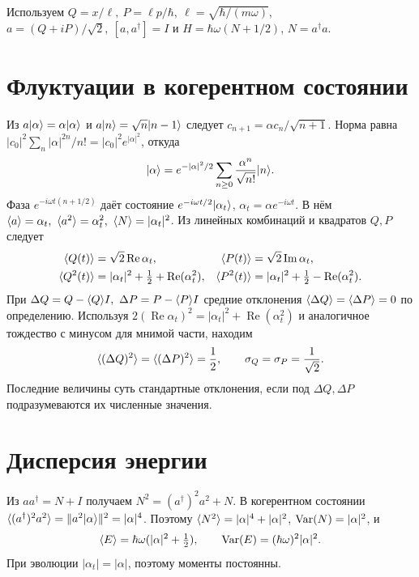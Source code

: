 \documentclass[11pt,a4paper]{article}
\begin{document}

Используем \(Q=x/\ell,\ P=\ell p/\hbar,\ \ell=\sqrt{\hbar/(m\omega)}\),
\(a=(Q+iP)/\sqrt2,\ [a,a^\dagger]=I\) и
\(H=\hbar\omega(N+1/2)\), \(N=a^\dagger a\).

\section{Флуктуации в когерентном состоянии}

Из \(a\lvert \alpha\rangle=\alpha\lvert \alpha\rangle\) и
\(a\lvert n\rangle=\sqrt n\lvert n-1\rangle\) следует
\(c_{n+1}=\alpha c_n/\sqrt{n+1}\). Норма равна
\(|c_0|^2\sum_n|\alpha|^{2n}/n!=|c_0|^2e^{|\alpha|^2}\),
откуда
\[
 \lvert \alpha\rangle=e^{-|\alpha|^2/2}\sum_{n\ge0}
                   \frac{\alpha^n}{\sqrt{n!}}\lvert n\rangle .
\]
Фаза \(e^{-i\omega t(n+1/2)}\) даёт состояние
\(e^{-i\omega t/2}\lvert \alpha_t\rangle\), \(\alpha_t=\alpha e^{-i\omega t}\).
В нём \(\avg{a}=\alpha_t,\ \avg{a^2}=\alpha_t^2,\ \avg{N}=|\alpha_t|^2\).
Из линейных комбинаций и квадратов \(Q,P\) следует
\begin{align*}
 \langle Q(t)\rangle&=\sqrt2\operatorname{Re}\alpha_t,
 &\langle P(t)\rangle&=\sqrt2\operatorname{Im}\alpha_t,\\
 \langle Q^2(t)\rangle&=|\alpha_t|^2+\tfrac12+\operatorname{Re}(\alpha_t^2),
 &\langle P^2(t)\rangle&=|\alpha_t|^2+\tfrac12-\operatorname{Re}(\alpha_t^2).
\end{align*}
При \(\Delta Q=Q-\langle Q\rangle I,\ \Delta P=P-\langle P\rangle I\)
средние отклонения \(\langle \Delta Q\rangle=\langle \Delta P\rangle=0\)
по определению. Используя
\(2(\operatorname{Re}\alpha_t)^2=|\alpha_t|^2+\operatorname{Re}(\alpha_t^2)\)
и аналогичное тождество с минусом для мнимой части, находим
\[
 \langle (\Delta Q)^2\rangle=\langle (\Delta P)^2\rangle=\frac12,\qquad
 \sigma_Q=\sigma_P=\frac1{\sqrt2}.
\]
Последние величины суть стандартные отклонения, если под
\(\Delta Q,\Delta P\) подразумеваются их численные значения.

\section{Дисперсия энергии}

Из \(aa^\dagger=N+I\) получаем \(N^2=(a^\dagger)^2 a^2+N\).
В когерентном состоянии \(\langle (a^\dagger)^2a^2\rangle
=\|a^2\lvert \alpha\rangle\|^2=|\alpha|^4\).
Поэтому \(\langle N^2\rangle=|\alpha|^4+|\alpha|^2\),
\(\operatorname{Var}(N)=|\alpha|^2\), и
\[
 \langle E\rangle=\hbar\omega(|\alpha|^2+\tfrac12),\qquad
 \operatorname{Var}(E)=(\hbar\omega)^2|\alpha|^2 .
\]
При эволюции \(|\alpha_t|=|\alpha|\), поэтому моменты постоянны.
\end{document}
